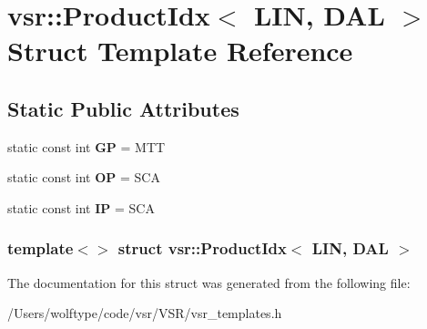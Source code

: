 \hypertarget{structvsr_1_1_product_idx_3_01_l_i_n_00_01_d_a_l_01_4}{\section{vsr\-:\-:Product\-Idx$<$ L\-I\-N, D\-A\-L $>$ Struct Template Reference}
\label{structvsr_1_1_product_idx_3_01_l_i_n_00_01_d_a_l_01_4}
}
\subsection*{Static Public Attributes}
\begin{DoxyCompactItemize}
\item 
\hypertarget{structvsr_1_1_product_idx_3_01_l_i_n_00_01_d_a_l_01_4_aae5c36c749f9a194650f6608d2cf235f}{static const int {\bfseries G\-P} = M\-T\-T}\label{structvsr_1_1_product_idx_3_01_l_i_n_00_01_d_a_l_01_4_aae5c36c749f9a194650f6608d2cf235f}

\item 
\hypertarget{structvsr_1_1_product_idx_3_01_l_i_n_00_01_d_a_l_01_4_a5443c060dccb6d289056066fb858793f}{static const int {\bfseries O\-P} = S\-C\-A}\label{structvsr_1_1_product_idx_3_01_l_i_n_00_01_d_a_l_01_4_a5443c060dccb6d289056066fb858793f}

\item 
\hypertarget{structvsr_1_1_product_idx_3_01_l_i_n_00_01_d_a_l_01_4_a5b12ffb62b2e423a9df4756375e3c7da}{static const int {\bfseries I\-P} = S\-C\-A}\label{structvsr_1_1_product_idx_3_01_l_i_n_00_01_d_a_l_01_4_a5b12ffb62b2e423a9df4756375e3c7da}

\end{DoxyCompactItemize}
\subsubsection*{template$<$$>$ struct vsr\-::\-Product\-Idx$<$ L\-I\-N, D\-A\-L $>$}



The documentation for this struct was generated from the following file\-:\begin{DoxyCompactItemize}
\item 
/\-Users/wolftype/code/vsr/\-V\-S\-R/vsr\-\_\-templates.\-h\end{DoxyCompactItemize}
